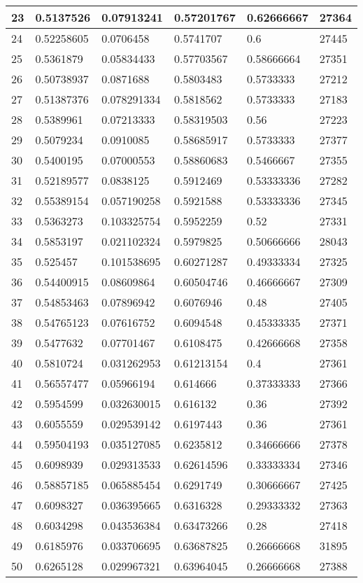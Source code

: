 \begin{longtable}{|l|l|l|l|l|l|}
23 & 0.5137526 & 0.07913241 & 0.57201767 & 0.62666667 & 27364 \\ \hline 
24 & 0.52258605 & 0.0706458 & 0.5741707 & 0.6 & 27445 \\ \hline 
25 & 0.5361879 & 0.05834433 & 0.57703567 & 0.58666664 & 27351 \\ \hline 
26 & 0.50738937 & 0.0871688 & 0.5803483 & 0.5733333 & 27212 \\ \hline 
27 & 0.51387376 & 0.078291334 & 0.5818562 & 0.5733333 & 27183 \\ \hline 
28 & 0.5389961 & 0.07213333 & 0.58319503 & 0.56 & 27223 \\ \hline 
29 & 0.5079234 & 0.0910085 & 0.58685917 & 0.5733333 & 27377 \\ \hline 
30 & 0.5400195 & 0.07000553 & 0.58860683 & 0.5466667 & 27355 \\ \hline 
31 & 0.52189577 & 0.0838125 & 0.5912469 & 0.53333336 & 27282 \\ \hline 
32 & 0.55389154 & 0.057190258 & 0.5921588 & 0.53333336 & 27345 \\ \hline 
33 & 0.5363273 & 0.103325754 & 0.5952259 & 0.52 & 27331 \\ \hline 
34 & 0.5853197 & 0.021102324 & 0.5979825 & 0.50666666 & 28043 \\ \hline 
35 & 0.525457 & 0.101538695 & 0.60271287 & 0.49333334 & 27325 \\ \hline 
36 & 0.54400915 & 0.08609864 & 0.60504746 & 0.46666667 & 27309 \\ \hline 
37 & 0.54853463 & 0.07896942 & 0.6076946 & 0.48 & 27405 \\ \hline 
38 & 0.54765123 & 0.07616752 & 0.6094548 & 0.45333335 & 27371 \\ \hline 
39 & 0.5477632 & 0.07701467 & 0.6108475 & 0.42666668 & 27358 \\ \hline 
40 & 0.5810724 & 0.031262953 & 0.61213154 & 0.4 & 27361 \\ \hline 
41 & 0.56557477 & 0.05966194 & 0.614666 & 0.37333333 & 27366 \\ \hline 
42 & 0.5954599 & 0.032630015 & 0.616132 & 0.36 & 27392 \\ \hline 
43 & 0.6055559 & 0.029539142 & 0.6197443 & 0.36 & 27361 \\ \hline 
44 & 0.59504193 & 0.035127085 & 0.6235812 & 0.34666666 & 27378 \\ \hline 
45 & 0.6098939 & 0.029313533 & 0.62614596 & 0.33333334 & 27346 \\ \hline 
46 & 0.58857185 & 0.065885454 & 0.6291749 & 0.30666667 & 27425 \\ \hline 
47 & 0.6098327 & 0.036395665 & 0.6316328 & 0.29333332 & 27363 \\ \hline 
48 & 0.6034298 & 0.043536384 & 0.63473266 & 0.28 & 27418 \\ \hline 
49 & 0.6185976 & 0.033706695 & 0.63687825 & 0.26666668 & 31895 \\ \hline 
50 & 0.6265128 & 0.029967321 & 0.63964045 & 0.26666668 & 27388 \\ \hline 
\end{longtable}